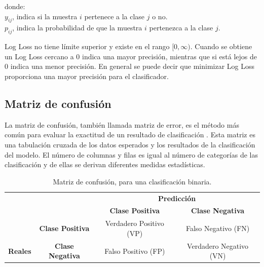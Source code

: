 donde:
\\
$y_{ij}$, indica si la muestra $i$ pertenece a la clase $j$ o no.\\
$p_{ij}$, indica la probabilidad de que la muestra $i$ pertenezca a la clase $j$.

\vspace{5mm} %

Log Loss no tiene l\'{i}mite superior y existe en el rango $[0, \infty )$. Cuando se obtiene un Log Loss cercano a 0 indica una mayor precisi\'{o}n, mientras que si est\'{a} lejos de 0 indica una menor precisi\'{o}n. En general se puede decir que minimizar Log Loss proporciona una mayor precisi\'{o}n para el clasificador.

\subsection{Matriz de confusi\'{o}n}

La matriz de confusi\'{o}n, tambi\'{e}n llamada matriz de error, es el m\'{e}todo m\'{a}s com\'{u}n para evaluar la exactitud de un resultado de clasificaci\'{o}n \cite{61}. Esta matriz es una tabulaci\'{o}n cruzada de los datos esperados y los resultados de la clasificaci\'{o}n del modelo. El n\'{u}mero de columnas y filas es igual al n\'{u}mero de categor\'{i}as de las clasificaci\'{o}n y de ellas se derivan diferentes medidas estad\'{i}sticas.

\begin{table}[]

\centering
\begin{center}
\begin{tabular}{ll|c|c|}
\cline{3-4}
                                                        &                                              & \multicolumn{2}{c|}{\textbf{Predicci\'{o}n}}                                                          \\ \cline{3-4} 
                                                        &                                              & \textbf{Clase Positiva}                         & \textbf{Clase Negativa}                         \\ \hline
\multicolumn{1}{|c|}{}                                  & \multicolumn{1}{c|}{\textbf{Clase Positiva}} & \cellcolor[HTML]{AADD99}Verdadero Positivo (VP) & \cellcolor[HTML]{FFCE93}Falso Negativo (FN)     \\ \cline{2-4} 
\multicolumn{1}{|c|}{\multirow{-2}{*}{\textbf{Reales}}} & \multicolumn{1}{c|}{\textbf{Clase Negativa}} & \cellcolor[HTML]{DF9F9F}Falso Positivo (FP)     & \cellcolor[HTML]{AADD99}Verdadero Negativo (VN) \\ \hline
\end{tabular}
\caption{Matriz de confusi\'{o}n, para una clasificaci\'{o}n binaria.}
\label{table:matriz}
\end{center}
\end{table}

